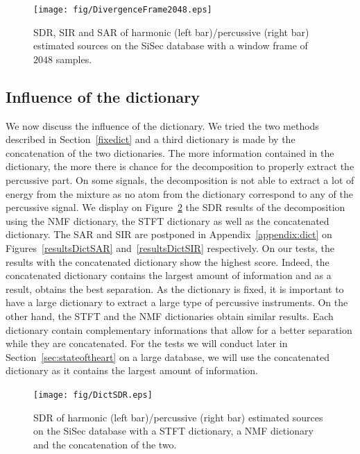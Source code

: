 \begin{figure}[htb]

  \centering 
  \texttt{[image: fig/DivergenceFrame2048.eps]}
  \caption{\label{frame2048} SDR, SIR and SAR of harmonic (left bar)/percussive (right bar) estimated sources on the SiSec database with a window frame of $2048$ samples.}
  
\end{figure}



\subsection{Influence of the dictionary}
\label{setup:dictionary}

We now discuss the influence of the dictionary. We tried the two methods described in Section~\ref{fixedict} and a third dictionary is made by the concatenation of the two dictionaries. The more information contained in the dictionary, the more there is chance for the decomposition to properly extract the percussive part. On some signals, the decomposition is not able to extract a lot of energy from the mixture as no atom from the dictionary correspond to any of the percussive signal.
We display on Figure~\ref{resultsDict} the SDR results of the decomposition using the NMF dictionary, the STFT dictionary as well as the concatenated dictionary. The SAR and SIR are postponed in Appendix~\ref{appendix:dict} on Figures~\ref{resultsDictSAR} and~\ref{resultsDictSIR} respectively. On our tests, the results with the concatenated dictionary show the highest score. Indeed, the concatenated dictionary contains the largest amount of information and as a result, obtains the best separation. As the dictionary is fixed, it is important to have a large dictionary to extract a large type of percussive instruments. On the other hand, the STFT and the NMF dictionaries obtain similar results. Each dictionary contain complementary informations that allow for a better separation while they are concatenated. For the tests we will conduct later in Section~\ref{sec:stateoftheart} on a large database, we will use the concatenated dictionary as it contains the largest amount of information. 


\begin{figure}[htb]

  \centering 
  \texttt{[image: fig/DictSDR.eps]}
  \caption{\label{resultsDict} SDR of harmonic (left bar)/percussive (right bar) estimated sources on the SiSec database with a STFT dictionary, a NMF dictionary and the concatenation of the two.}
  
\end{figure}


